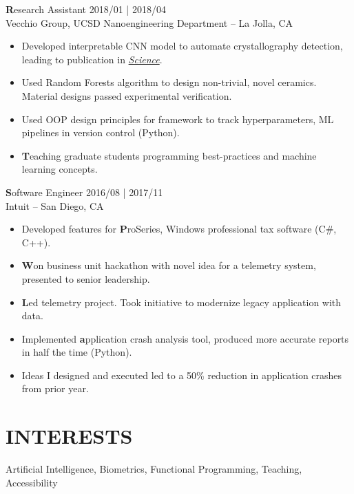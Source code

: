 \documentclass[line,mm]{res}
\begin{document}
    {\textbf Research Assistant } \hfill 2018/01 | 2018/04 \\
    Vecchio Group, UCSD Nanoengineering Department -- La Jolla, CA
    \begin{itemize}
        \itemsep -2pt
        \item Developed interpretable CNN model to automate crystallography detection, leading to publication in \href{https://science.sciencemag.org/content/367/6477/564.abstract}{\it Science}.
        \item Used Random Forests algorithm to design non-trivial, novel ceramics. Material designs passed experimental verification.
        \item Used OOP design principles for framework to track hyperparameters, ML pipelines in version control (Python).
        \item {\textbf Teaching graduate students} programming best-practices and machine learning concepts.
    \end{itemize}

    {\textbf Software Engineer} \hfill 2016/08 | 2017/11 \\
    Intuit -- San Diego, CA
    \begin{itemize}
        \itemsep -2pt
        \item Developed features for {\textbf ProSeries}, Windows professional tax software (C\#, C++).
        \item {\textbf Won business unit hackathon} with novel idea for a telemetry system, presented to senior leadership.
        \item {\textbf Led telemetry project}. Took initiative to modernize legacy application with data.
        \item Implemented {\textbf application crash analysis tool}, produced more accurate reports in half the time (Python).
        \item Ideas I designed and executed led to a 50\% reduction in application crashes from prior year.
    \end{itemize}



    \section{INTERESTS}\label{sec:interests}
    Artificial Intelligence, Biometrics, Functional Programming, Teaching, Accessibility
\end{document}
